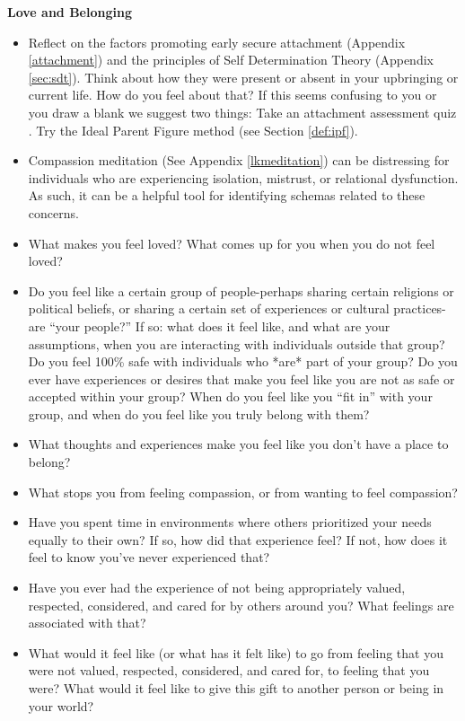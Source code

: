 \documentclass[12pt,letterpaper]{book}
\begin{document}
\vspace{\baselineskip}

\noindent \textbf{Love and Belonging}
\begin{itemize}
    \item Reflect on the factors promoting early secure attachment (Appendix \ref{attachment}) and the principles of Self Determination Theory (Appendix \ref{sec:sdt}). Think about how they were present or absent in your upbringing or current life. How do you feel about that? If this seems confusing to you or you draw a blank we suggest two things: Take an attachment assessment quiz \cite{attachmentProject}. Try the Ideal Parent Figure method (see Section \ref{def:ipf}).
    \item Compassion meditation (See Appendix \ref{lkmeditation}) can be distressing for individuals who are experiencing isolation, mistrust, or relational dysfunction. As such, it can be a helpful tool for identifying schemas related to these concerns.
    \item What makes you feel loved? What comes up for you when you do not feel loved?
    \item Do you feel like a certain group of people-perhaps sharing certain religions or political beliefs, or sharing a certain set of experiences or cultural practices-are “your people?”  If so: what does it feel like, and what are your assumptions, when you are interacting with individuals outside that group? Do you feel 100\% safe with individuals who *are* part of your group? Do you ever have experiences or desires that make you feel like you are not as safe or accepted within your group? When do you feel like you “fit in” with your group, and when do you feel like you truly belong with them?
    \item What thoughts and experiences make you feel like you don't have a place to belong?
    \item What stops you from feeling compassion, or from wanting to feel compassion?
    \item Have you spent time in environments where others prioritized your needs equally to their own? If so, how did that experience feel? If not, how does it feel to know you've never experienced that?
    \item Have you ever had the experience of not being appropriately valued, respected, considered, and cared for by others around you?  What feelings are associated with that?
    \item What would it feel like (or what has it felt like) to go from feeling that you were not valued, respected, considered, and cared for, to feeling that you were? What would it feel like to give this gift to another person or being in your world?

\end{itemize}
\end{document}
